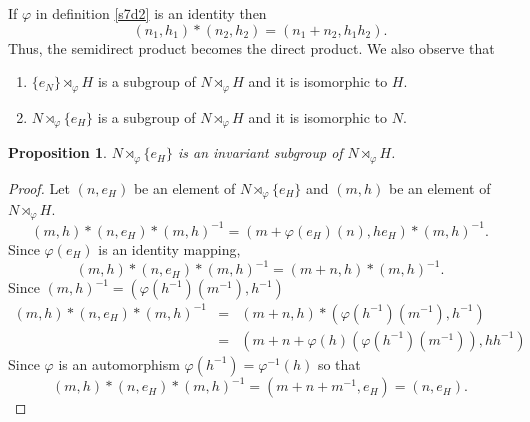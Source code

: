 \documentclass{article}
\theoremstyle{plain}
\numberwithin{thm}{section}
\theoremstyle{plain}
\newtheorem{prop}{Proposition}
\numberwithin{prop}{section}
\theoremstyle{definition}
\numberwithin{defn}{section}
\theoremstyle{remark}
\numberwithin{equation}{section}
\begin{document}
If $\varphi$ in definition \ref{s7d2} is an identity then 
\begin{equation}\label{s7e1}
(n_1, h_1) \ast (n_2, h_2) = (n_1 + n_2, h_1h_2).
\end{equation}
Thus, the semidirect product becomes the direct product. We also observe that
\begin{enumerate}
\item $\{e_N\} \rtimes_\varphi H$ is a subgroup of $N \rtimes_{\varphi} H$ and 
it is isomorphic to $H$.
\item $N \rtimes_\varphi \{e_H\}$ is a subgroup of $N \rtimes_{\varphi} H$ and 
it is isomorphic to $N$.
\end{enumerate}

\begin{prop}\label{s7p1}
$N \rtimes_\varphi \{e_H\}$ is an invariant subgroup of $N \rtimes_\varphi H$.
\end{prop}
\begin{proof}
Let $(n, e_H)$ be an element of $N \rtimes_\varphi \{e_H\}$ and $(m, h)$ be
an element of $N \rtimes_\varphi H$. 
\[
(m,h)\ast(n,e_H)\ast(m,h)^{-1} = (m + \varphi(e_H)(n), h e_H)\ast(m, h)^{-1}.
\]
Since $\varphi(e_H)$ is an identity mapping,
\[
(m,h)\ast(n,e_H)\ast(m,h)^{-1} = (m + n, h)\ast(m, h)^{-1}.
\]
Since $(m, h)^{-1} = (\varphi(h^{-1})(m^{-1}), h^{-1})$
\begin{eqnarray*}
(m,h)\ast(n,e_H)\ast(m,h)^{-1} &=& (m + n, h)\ast
(\varphi(h^{-1})(m^{-1}), h^{-1}) \\
 &=& (m + n + \varphi(h)(\varphi(h^{-1})(m^{-1})), hh^{-1}) 
\end{eqnarray*}
Since $\varphi$ is an automorphism $\varphi(h^{-1}) = \varphi^{-1}(h)$ so that
\[
(m,h)\ast(n,e_H)\ast(m,h)^{-1} = (m + n + m^{-1}, e_H) = (n, e_H).
\]
\end{proof}

\nocite{*}


\end{document}
